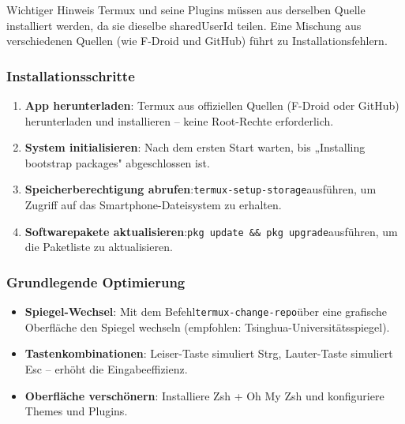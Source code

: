 \begin{tcbwarn}{Wichtiger Hinweis}
Termux und seine Plugins müssen aus derselben Quelle installiert werden, da sie dieselbe sharedUserId teilen. Eine Mischung aus verschiedenen Quellen (wie F-Droid und GitHub) führt zu Installationsfehlern.

\end{tcbwarn}


\subsubsection*{Installationsschritte}

\begin{enumerate}
  \item \textbf{App herunterladen}: Termux aus offiziellen Quellen (F-Droid oder GitHub) herunterladen und installieren – keine Root-Rechte erforderlich.
  \item \textbf{System initialisieren}: Nach dem ersten Start warten, bis „Installing bootstrap packages" abgeschlossen ist.
  \item \textbf{Speicherberechtigung abrufen}:\texttt{termux-\allowbreak setup-\allowbreak storage}ausführen, um Zugriff auf das Smartphone-Dateisystem zu erhalten.
  \item \textbf{Softwarepakete aktualisieren}:\texttt{pkg update \&\& pkg upgrade}ausführen, um die Paketliste zu aktualisieren.
\end{enumerate}

\subsubsection*{Grundlegende Optimierung}

\begin{itemize}
  \item \textbf{Spiegel-Wechsel}: Mit dem Befehl\texttt{termux-\allowbreak change-\allowbreak repo}über eine grafische Oberfläche den Spiegel wechseln (empfohlen: Tsinghua-Universitätsspiegel).
  \item \textbf{Tastenkombinationen}: Leiser-Taste simuliert Strg, Lauter-Taste simuliert Esc – erhöht die Eingabeeffizienz.
  \item \textbf{Oberfläche verschönern}: Installiere Zsh + Oh My Zsh und konfiguriere Themes und Plugins.
\end{itemize}


